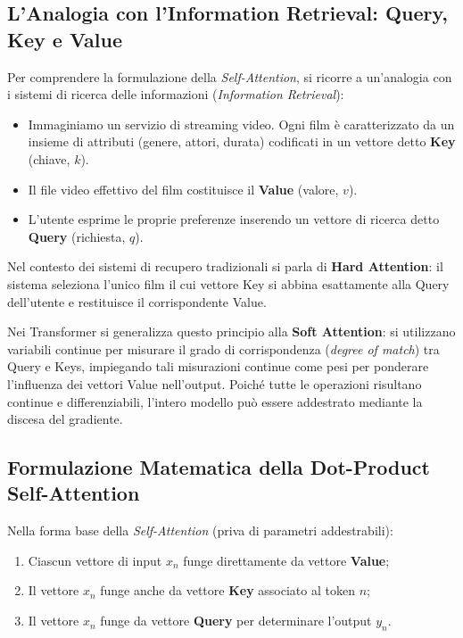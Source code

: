 \subsection{L'Analogia con l'Information Retrieval: Query, Key e Value}
Per comprendere la formulazione della \textit{Self-Attention}, si ricorre a un'analogia con i sistemi di ricerca delle informazioni (\textit{Information Retrieval}):
\begin{itemize}
    \item Immaginiamo un servizio di streaming video. Ogni film è caratterizzato da un insieme di attributi (genere, attori, durata) codificati in un vettore detto \textbf{Key} (chiave, $k$).
    \item Il file video effettivo del film costituisce il \textbf{Value} (valore, $v$).
    \item L'utente esprime le proprie preferenze inserendo un vettore di ricerca detto \textbf{Query} (richiesta, $q$).
\end{itemize}

Nel contesto dei sistemi di recupero tradizionali si parla di \textbf{Hard Attention}: il sistema seleziona l'unico film il cui vettore Key si abbina esattamente alla Query dell'utente e restituisce il corrispondente Value.

Nei Transformer si generalizza questo principio alla \textbf{Soft Attention}: si utilizzano variabili continue per misurare il grado di corrispondenza (\textit{degree of match}) tra Query e Keys, impiegando tali misurazioni continue come pesi per ponderare l'influenza dei vettori Value nell'output. Poiché tutte le operazioni risultano continue e differenziabili, l'intero modello può essere addestrato mediante la discesa del gradiente.

\subsection{Formulazione Matematica della Dot-Product Self-Attention}
Nella forma base della \textit{Self-Attention} (priva di parametri addestrabili):
\begin{enumerate}
    \item Ciascun vettore di input $x_n$ funge direttamente da vettore \textbf{Value};
    \item Il vettore $x_n$ funge anche da vettore \textbf{Key} associato al token $n$;
    \item Il vettore $x_n$ funge da vettore \textbf{Query} per determinare l'output $y_n$.
\end{enumerate}


